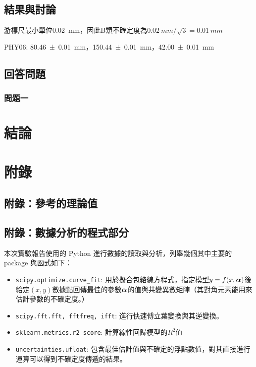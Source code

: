 \documentclass[10pt]{report}
\begin{document}
\section{結果與討論}

游標尺最小單位\SI{0.02}{mm}，因此B類不確定度為$\SI{0.02}{mm}/\sqrt{3}=\SI{0.01}{mm}$

PHY06: \SI{80.46(1)}{mm}，\SI{150.44(1)}{mm}，\SI{42.00(1)}{mm}










\section{回答問題}

\newcommand\question[1]{
  \fbox{\parbox{\dimexpr\linewidth - 2\fboxrule - 2\fboxsep}{#1}}\vspace{2mm}
}

\subsection{問題一}\label{Q1}

\question{
}

\chapter{結論}

\appendix

\chapter{附錄}

\section{附錄：參考的理論值}

\section{附錄：數據分析的程式部分}

本次實驗報告使用的 Python 進行數據的讀取與分析，列舉幾個其中主要的 package 與函式如下：
\begin{itemize}
    \item \verb|scipy.optimize.curve_fit|: 用於擬合包絡線方程式，指定模型$y=f(x,\boldsymbol{\mathbf{\alpha}})$後給定$(x,y)$數據點回傳最佳的參數$\boldsymbol{\mathbf{\alpha}}$的值與共變異數矩陣（其對角元素能用來估計參數的不確定度。）
    \item \verb|scipy.fft.fft, fftfreq, ifft|: 進行快速傅立葉變換與其逆變換。
    \item \verb|sklearn.metrics.r2_score|: 計算線性回歸模型的$R^2$值
    \item \verb|uncertainties.ufloat|: 包含最佳估計值與不確定的浮點數值，對其直接進行運算可以得到不確定度傳遞的結果。
\end{itemize}

\end{document}
